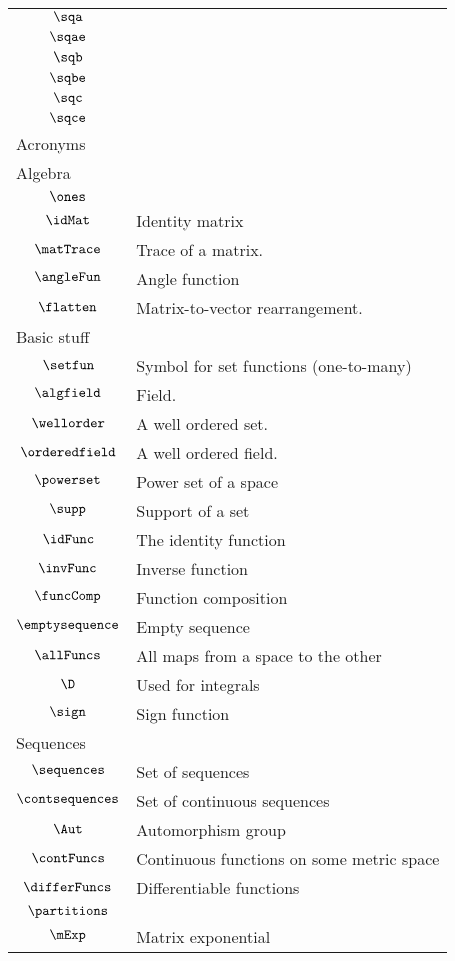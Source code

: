 \begin{longtable}{cl}
 \hline
$\sqa$ & \\ 
 $\sqae$ & \\ 
 $\sqb$ & \\ 
 $\sqbe$ & \\ 
 $\sqc$ & \\ 
 $\sqce$ & \\ 
 \multicolumn{2}{l}{Acronyms}\\ 
 \hline
\multicolumn{2}{l}{Algebra}\\ 
 \hline
$\ones$ & \\ 
 $\idMat$ &  Identity matrix\\ 
 $\matTrace$ &  Trace of a matrix.\\ 
 $\angleFun$ &  Angle function\\ 
 $\flatten$ &  Matrix-to-vector rearrangement.\\ 
 \multicolumn{2}{l}{Basic stuff}\\ 
 \hline
$\setfun$ &  Symbol for set functions (one-to-many)\\ 
 $\algfield$ &  Field.\\ 
 $\wellorder$ &  A well ordered set.\\ 
 $\orderedfield$ &  A well ordered field.\\ 
 $\powerset$ &  Power set of a space\\ 
 $\supp$ &  Support of a set\\ 
 $\idFunc$ &  The identity function\\ 
 $\invFunc$ &  Inverse function \\ 
 $\funcComp$ &  Function composition\\ 
 $\emptysequence$ &  Empty sequence\\ 
 $\allFuncs$ &  All maps from a space to the other\\ 
 $\D$ &  Used for integrals\\ 
 $\sign$ &  Sign function\\ 
 \multicolumn{2}{l}{Sequences}\\ 
 \hline
$\sequences$ &  Set of sequences\\ 
 $\contsequences$ &  Set of continuous sequences\\ 
 $\Aut$ &  Automorphism group\\ 
 $\contFuncs$ &  Continuous functions on some metric space \\ 
 $\differFuncs$ &  Differentiable functions\\ 
 $\partitions$ & \\ 
 $\mExp$ &  Matrix exponential\\ 

\end{longtable}
